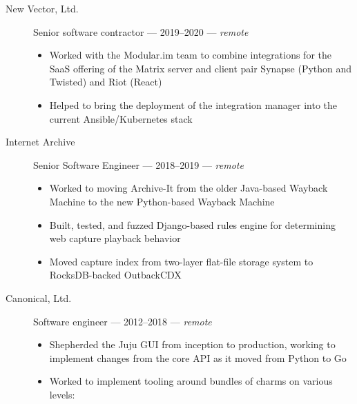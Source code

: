 \documentclass[letterpaper]{memoir}
\begin{document}
\begin{description}
    \item[New Vector, Ltd.]
    Senior software contractor --- 2019--2020 --- \emph{remote}

    \begin{itemize}
        \tightlist
        \item
        Worked with the Modular.im team to combine integrations for the SaaS offering of the Matrix server and client pair Synapse (Python and Twisted) and Riot (React)
        \item
        Helped to bring the deployment of the integration manager into the current Ansible/Kubernetes stack
    \end{itemize}
    \item[Internet Archive]
    Senior Software Engineer --- 2018--2019 --- \emph{remote}

    \begin{itemize}
        \tightlist
        \item
        Worked to moving Archive-It from the older Java-based Wayback Machine to the new Python-based Wayback Machine
        \item
        Built, tested, and fuzzed Django-based rules engine for determining web capture playback behavior
        \item
        Moved capture index from two-layer flat-file storage system to RocksDB-backed OutbackCDX
    \end{itemize}
    \item[Canonical, Ltd.]
    Software engineer --- 2012--2018 --- \emph{remote}

    \begin{itemize}
        \tightlist
        \item
        Shepherded the Juju GUI from inception to production, working to implement changes from the core API as it moved from Python to Go
        \item
        Worked to implement tooling around bundles of charms on various levels:


\end{itemize}
\end{description}
\end{document}
